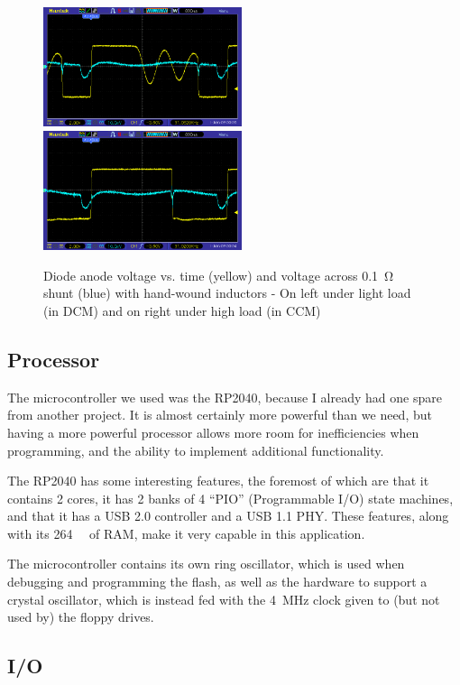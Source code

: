 \documentclass[a4paper]{article}
\begin{document}
\begin{figure}
  \centering
  \includegraphics[height=3.5cm]{pic_25_1}\hfill\includegraphics[height=3.5cm]{pic_25_4}
  \caption[Voltage and current traces with handwound inductors]{Diode
    anode voltage vs. time (yellow) and voltage across \qty{0.1}{\ohm}
    shunt (blue) with hand-wound inductors - On left under light load (in
    DCM) and on right under high load (in CCM)}
\end{figure}

\subsection{Processor}

The microcontroller we used was the RP2040, because I already had one
spare from another project. It is almost certainly more powerful than
we need, but having a more powerful processor allows more room for
inefficiencies when programming, and the ability to implement
additional functionality.

The RP2040 has some interesting features, the foremost of which are
that it contains 2 cores, it has 2 banks of 4 ``PIO'' (Programmable
I/O) state machines, and that it has a USB 2.0 controller and a USB
1.1 PHY. These features, along with its \qty{264}{\kibi\byte} of RAM,
make it very capable in this application.

The microcontroller contains its own ring oscillator, which is used
when debugging and programming the flash, as well as the hardware to
support a crystal oscillator, which is instead fed with the
\qty{4}{\MHz} clock given to (but not used by) the floppy drives.

\subsection{I/O}
\end{document}
